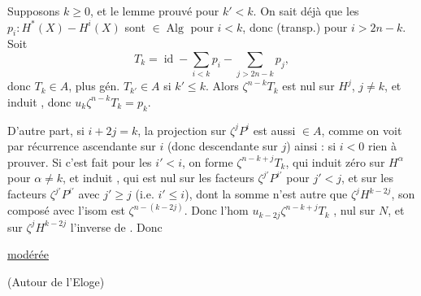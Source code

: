 
Supposons $k\geq0$, et le lemme prouvé pour $k'<k$. On sait déjà que les $p_i:H^*(X)\mathbin{-}H^i(X)$ sont $\in\operatorname{Alg}$ pour $i<k$, donc (transp.) pour $i>2n-k$. Soit
\[
T_k=\operatorname{id}-\sum_{i<k}p_i-\sum_{j>2n-k}p_j,
\]
donc $T_k\in A$, plus gén. $T_{k'}\in A$ si $k'\leq k$. Alors $\zeta^{n-k}T_k$ est nul sur $H^j$, $j\neq k$, et induit
, donc $u_k\zeta^{n-k}T_k=p_k$.

D'autre part, si $i+2j=k$,  la projection sur $\zeta^jP^i$ est aussi $\in A$, comme on voit  par récurrence ascendante sur $i$ (donc descendante sur $j$) ainsi : si $i<0$ rien à prouver. Si c'est fait pour les $i'<i$, on forme $\zeta^{n-k+j}T_k$, \deleted{$\unsure{\zeta}$} qui induit zéro sur $H^\alpha$ pour $\alpha\neq k$, et induit
, qui est nul  sur les facteurs $\zeta^{j'}P^{i'}$ pour $j'<j$,  et sur les facteurs $\zeta^{j'}P^{i'}$ avec $j'\geq j$ (i.e. $i'\leq i$),  dont la somme n'est autre que $\zeta^jH^{k-2j}$, son composé avec l'isom
est $\zeta^{n-(k-2j)}$. Donc l'hom $u_{k-2j}\zeta^{n-k+j}T_k$ , nul sur $N$, et sur $\zeta^jH^{k-2j}$ l'inverse de
. Donc


\uline{ modérée}

(Autour de l'Eloge)

